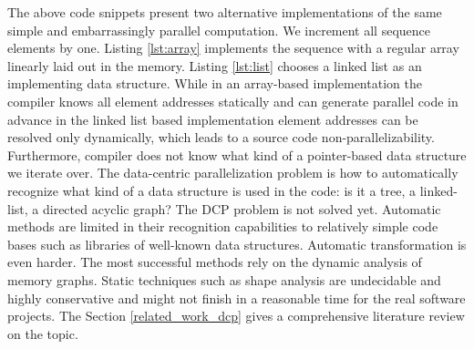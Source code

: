 \quad The above code snippets present two alternative implementations of the same simple and embarrassingly parallel computation. We increment all sequence elements by one. Listing \ref{lst:array} implements the sequence with a regular array linearly laid out in the memory. Listing \ref{lst:list} chooses a linked list as an implementing data structure. While in an array-based implementation the compiler knows all element addresses statically and can generate parallel code in advance in the linked list based implementation element addresses can be resolved only dynamically, which leads to a source code non-parallelizability. Furthermore, compiler does not know what kind of a pointer-based data structure we iterate over.\newline\null
\quad The data-centric parallelization problem is how to automatically recognize what kind of a data structure is used in the code: is it a tree, a linked-list, a directed acyclic graph? The DCP problem is not solved yet. Automatic methods are limited in their recognition capabilities to relatively simple code bases such as libraries of well-known data structures. Automatic transformation is even harder. The most successful methods rely on the dynamic analysis of memory graphs. Static techniques such as shape analysis are undecidable and highly conservative and might not finish in a reasonable time for the real software projects. The Section \ref{related_work_dcp} gives a comprehensive literature review on the topic.
